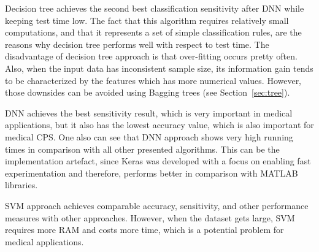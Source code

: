 Decision tree achieves the second best 
classification sensitivity after DNN while keeping test time low. 
The fact that this algorithm requires relatively small computations, 
and that it represents a set of simple classification rules, are the 
reasons why decision tree performs well with respect to test time. 
The disadvantage of decision tree approach is that over-fitting 
occurs 
pretty often. Also, when the input 
data has inconsistent sample size, its information gain tends to be 
characterized by the features which has more numerical values. 
However, those downsides can be avoided using Bagging trees (see 
Section~\ref{sec:tree}).

DNN achieves the best sensitivity result, which is very important in 
medical applications, but it also has the lowest accuracy value, 
which is also important for medical CPS.  
One also can see that DNN approach shows very high running times in 
comparison with all other presented algorithms. This can be the 
implementation artefact, since Keras was developed with a focus on 
enabling fast experimentation and therefore, performs better in 
comparison with MATLAB libraries. 

SVM approach achieves comparable accuracy, sensitivity, and 
other performance 
measures with other approaches. 
However, when the dataset gets large, SVM requires more RAM 
and costs more time, which is a potential problem for medical 
applications. 



